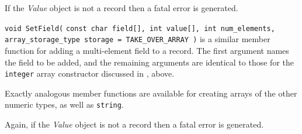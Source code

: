 \begin{sloppy}
\begin{list}{}{}
If the {\em Value} object is not a record then a fatal error is
generated.

\item[{\tt void SetField(}] {\tt const char field[], int value[],
int num\_elements, array\_storage\_type storage = TAKE\_OVER\_ARRAY )}
is a similar member function
for adding a multi-element field to a record.  The first argument names
the field to be added, and the remaining arguments are identical to those
for the {\tt integer} array constructor discussed in ,
above.

Exactly analogous member functions are available for creating arrays of
the other numeric types, as well as {\tt string}.

Again, if the {\em Value} object is not a record then a fatal error is
generated.

\end{list}
\end{sloppy}

